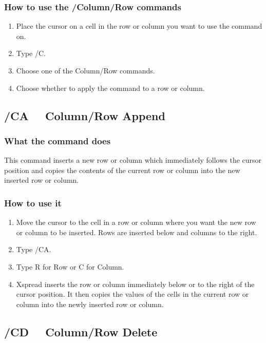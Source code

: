 \subsubsection*{How to use the /Column/Row commands}
\begin{enumerate}
  \item{Place the cursor on a cell in the row or column you want to use
        the command on.}
  \item{Type /C.}
  \item{Choose one of the Column/Row commands.}
  \item{Choose whether to apply the command to a row or column.}
\end{enumerate}


\subsection*{/CA \ \  Column/Row Append}

\subsubsection*{What the command does}
This command inserts a new row or column which immediately follows the 
cursor position and copies the contents of the current row or column 
into the new inserted row or column.

\subsubsection*{How to use it}
\begin{enumerate}
\item{ Move the cursor to the cell in a row or column where you want the
new row or column to be inserted.  Rows are inserted below and 
columns to the right.}
\item{Type /CA.}
\item{Type R for Row or C for Column.}
\item{ Xspread inserts the row or column immediately below or to the
right of the cursor position.  It then copies the values of the 
cells in the current row or column into the newly inserted row or 
column.}
\end{enumerate}


\subsection*{ /CD \ \ Column/Row Delete}
        

